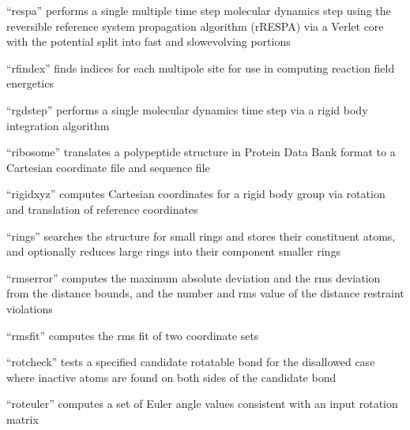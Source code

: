 \documentclass[letterpaper,11pt,english]{sphinxmanual}
\begin{document}

“respa” performs a single multiple time step molecular dynamics
step using the reversible reference system propagation algorithm
(r\sphinxhyphen{}RESPA) via a Verlet core with the potential split into fast\sphinxhyphen{}
and slow\sphinxhyphen{}evolving portions


“rfindex” finds indices for each multipole site for use
in computing reaction field energetics


“rgdstep” performs a single molecular dynamics time step
via a rigid body integration algorithm


“ribosome” translates a polypeptide structure in Protein Data
Bank format to a Cartesian coordinate file and sequence file


“rigidxyz” computes Cartesian coordinates for a rigid body
group via rotation and translation of reference coordinates


“rings” searches the structure for small rings and stores
their constituent atoms, and optionally reduces large rings
into their component smaller rings


“rmserror” computes the maximum absolute deviation and the
rms deviation from the distance bounds, and the number and
rms value of the distance restraint violations


“rmsfit” computes the rms fit of two coordinate sets



“rotcheck” tests a specified candidate rotatable bond for
the disallowed case where inactive atoms are found on both
sides of the candidate bond


“roteuler” computes a set of Euler angle values consistent
with an input rotation matrix

\end{document}
